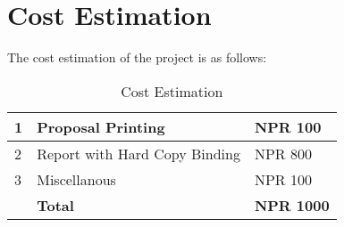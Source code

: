 \section{Cost Estimation}


The cost estimation of the project is as follows:

\begin{table}[h!]
\begin{center}
\begin{tabular}{ | m{} | m{}| m{} | } 
\hline
1& Proposal Printing & NPR 100  \\ 
\hline
2& Report with Hard Copy Binding & NPR 800 \\ 
\hline
3& Miscellanous & NPR 100 \\ 
\hline
& \textbf{Total} & \textbf{NPR 1000} \\ 
\hline
\end{tabular}
\caption{Cost Estimation}
\label{table:1}
\end{center}
\end{table}

